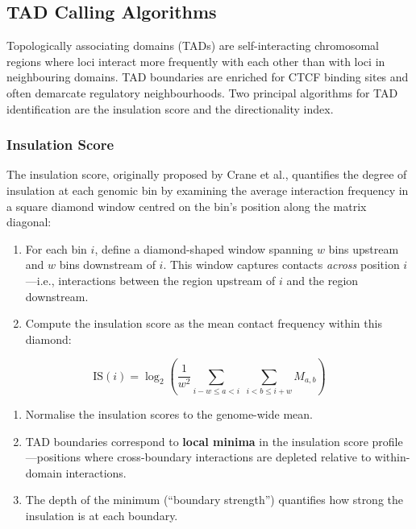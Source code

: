 \subsection{TAD Calling Algorithms}
\label{subsec:3dgenome:tad-calling}

Topologically associating domains (TADs) are self-interacting chromosomal regions where loci interact more frequently with each other than with loci in neighbouring domains. TAD boundaries are enriched for CTCF binding sites and often demarcate regulatory neighbourhoods. Two principal algorithms for TAD identification are the insulation score and the directionality index.

\subsubsection{Insulation Score}
\label{subsubsec:3dgenome:insulation}

The insulation score, originally proposed by Crane et al., quantifies the degree of insulation at each genomic bin by examining the average interaction frequency in a square diamond window centred on the bin's position along the matrix diagonal:

\begin{enumerate}[itemsep=2pt]
  \item For each bin $i$, define a diamond-shaped window spanning $w$ bins upstream and $w$ bins downstream of $i$. This window captures contacts \textit{across} position $i$---i.e., interactions between the region upstream of $i$ and the region downstream.
  \item Compute the insulation score as the mean contact frequency within this diamond:
\end{enumerate}
\begin{equation}
\label{eq:3dgenome:insulation-score}
\text{IS}(i) = \log_2\!\left(\frac{1}{w^2}\sum_{i-w \leq a < i}\;\sum_{i < b \leq i+w} M_{a,b}\right)
\end{equation}
\begin{enumerate}[resume, itemsep=2pt]
  \item Normalise the insulation scores to the genome-wide mean.
  \item TAD boundaries correspond to \textbf{local minima} in the insulation score profile---positions where cross-boundary interactions are depleted relative to within-domain interactions.
  \item The depth of the minimum (``boundary strength'') quantifies how strong the insulation is at each boundary.
\end{enumerate}

